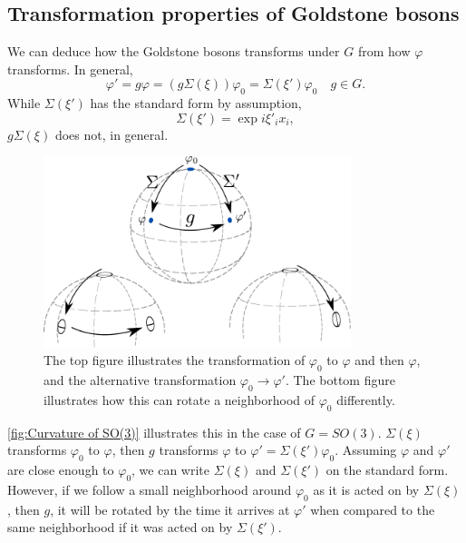 \subsection*{Transformation properties of Goldstone bosons}
We can deduce how the Goldstone bosons transforms under $G$ from how $\varphi$ transforms.
In general, 
\begin{equation}
    \varphi' = g \varphi = (g \Sigma(\xi)) \varphi_0 = \Sigma(\xi') \varphi_0 \quad g \in G.
\end{equation}
While $\Sigma(\xi')$ has the standard form by assumption,
\begin{equation}
    \Sigma(\xi') = \exp{i \xi'_i x_i},
\end{equation}
$g\Sigma(\xi)$ does not, in general.

\begin{figure}[h]
    \centering
    \includegraphics[width=0.8\textwidth]{figurer/curvature.pdf}
    \caption{The top figure illustrates the transformation of $\varphi_0$ to $\varphi$ and then $\varphi$, and the alternative transformation $\varphi_0 \rightarrow \varphi'$. The bottom figure illustrates how this can rotate a neighborhood of $\varphi_0$ differently.}
    \label{fig:Curvature of SO(3)}
\end{figure}
\autoref{fig:Curvature of SO(3)} illustrates this in the case of $G = SO(3)$.
$\Sigma(\xi)$ transforms $\varphi_0$ to $\varphi$, then $g$ transforms $\varphi$ to $\varphi' = \Sigma(\xi') \varphi_0$.
Assuming $\varphi$ and $\varphi'$ are close enough to $\varphi_0$, we can write $\Sigma(\xi)$ and $\Sigma(\xi')$ on the standard form.
However, if we follow a small neighborhood around $\varphi_0$ as it is acted on by $\Sigma(\xi)$, then $g$, it will be rotated by the time it arrives at $\varphi'$ when compared to the same neighborhood if it was acted on by $\Sigma(\xi')$.


